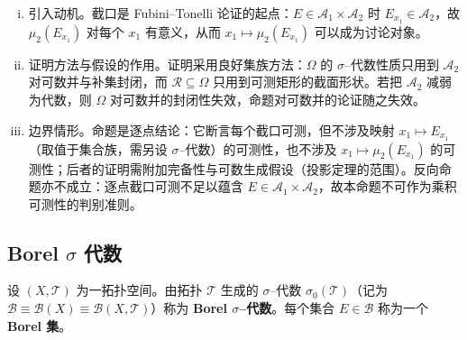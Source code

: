 \documentclass[../../main.tex]{subfiles}%
\begin{document}
\begin{remark}\label{remark:ch01-截面}
\begin{enumerate}[(i)]
\item 引入动机。截口是 Fubini--Tonelli 论证的起点：$E\in\mathcal{A}_1\times\mathcal{A}_2$ 时 $E_{x_1}\in\mathcal{A}_2$，故 $\mu_2(E_{x_1})$ 对每个 $x_1$ 有意义，从而 $x_1\mapsto\mu_2(E_{x_1})$ 可以成为讨论对象。
\item 证明方法与假设的作用。证明采用良好集族方法：$\Omega$ 的 $\sigma$--代数性质只用到 $\mathcal{A}_2$ 对可数并与补集封闭，而 $\mathcal{R}\subseteq\Omega$ 只用到可测矩形的截面形状。若把 $\mathcal{A}_2$ 减弱为代数，则 $\Omega$ 对可数并的封闭性失效，命题对可数并的论证随之失效。
\item 边界情形。命题是逐点结论：它断言每个截口可测，但不涉及映射 $x_1\mapsto E_{x_1}$（取值于集合族，需另设 $\sigma$--代数）的可测性，也不涉及 $x_1\mapsto\mu_2(E_{x_1})$ 的可测性；后者的证明需附加完备性与可数生成假设（投影定理的范围）。反向命题亦不成立：逐点截口可测不足以蕴含 $E\in\mathcal{A}_1\times\mathcal{A}_2$，故本命题不可作为乘积可测性的判别准则。
\end{enumerate}
\end{remark}

\subsection{Borel $\sigma$ 代数}\label{subsection:ch01-Borel代数}

\begin{definition}\label{definition:ch01-Borel代数}
设 $(X,\mathcal{T})$ 为一拓扑空间。由拓扑 $\mathcal{T}$ 生成的 $\sigma$--代数 $\sigma_0(\mathcal{T})$（记为 $\mathcal{B}\equiv\mathcal{B}(X)\equiv\mathcal{B}(X,\mathcal{T})$）称为 \textbf{Borel $\sigma$--代数}。每个集合 $E\in\mathcal{B}$ 称为一个 \textbf{Borel 集}。
\end{definition}
\end{document}
